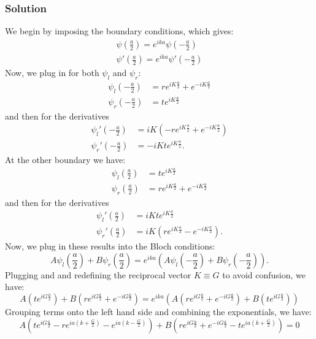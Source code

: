 \documentclass[12pt]{article}
\begin{document}
\subsubsection{Solution}
We begin by imposing the boundary conditions, which gives:
\begin{align}
    \psi(\frac{a}{2}) = e^{ika}\psi(-\frac{a}{2}) \\
    \psi'(\frac{a}{2}) = e^{ika}\psi'(-\frac{a}{2})
\end{align}
Now, we plug in for both $\psi_l$ and $\psi_r$:
\begin{align}
    \psi_l(-\frac{a}{2}) &= re^{iK\frac{a}{2}} + e^{-iK\frac{a}{2}} \\
    \psi_r(-\frac{a}{2}) &= te^{iK\frac{a}{2}}
\end{align}
and then for the derivatives
\begin{align}
    \psi_l'(-\frac{a}{2}) &= iK\left(-re^{iK\frac{a}{2}} + e^{-iK\frac{a}{2}}\right) \\
    \psi_r'(-\frac{a}{2}) &= -iKte^{iK\frac{a}{2}}.
\end{align}
At the other boundary we have:
\begin{align}
    \psi_l(\frac{a}{2}) &= t e^{iK\frac{a}{2}} \\
    \psi_r(\frac{a}{2}) &= re^{iK\frac{a}{2}} + e^{-iK\frac{a}{2}}
\end{align}
and then for the derivatives
\begin{align}
    \psi_l'(\frac{a}{2}) &= iKte^{iK\frac{a}{2}} \\
    \psi_r'(\frac{a}{2}) &= iK\left(re^{iK\frac{a}{2}} - e^{-iK\frac{a}{2}}\right).
\end{align}
Now, we plug in these results into the Bloch conditions:
\begin{equation}
    A\psi_l(\frac{a}{2}) + B\psi_r(\frac{a}{2}) = e^{ika}\left(A\psi_l(-\frac{a}{2}) + B\psi_r(-\frac{a}{2})\right).
\end{equation}
Plugging and and redefining the reciprocal vector $K\equiv G$ to avoid confusion, we have:
\begin{equation}
    A\left(t e^{iG\frac{a}{2}}\right) + B\left(re^{iG\frac{a}{2}} + e^{-iG\frac{a}{2}}\right) = e^{ika}\left(A\left(re^{iG\frac{a}{2}} + e^{-iG\frac{a}{2}}\right) + B\left(te^{iG\frac{a}{2}}\right)\right)
\end{equation}
Grouping terms onto the left hand side and combining the exponentials, we have:
\begin{equation}
    A\left(t e^{iG\frac{a}{2}} - re^{ia\left(k+\frac{G}{2} \right)} - e^{ia\left(k-\frac{G}{2} \right)}\right) + B\left(re^{iG\frac{a}{2}} + e^{-iG\frac{a}{2}} - te^{ia\left(k+\frac{G}{2} \right)}\right) = 0
\end{equation}
\end{document}
